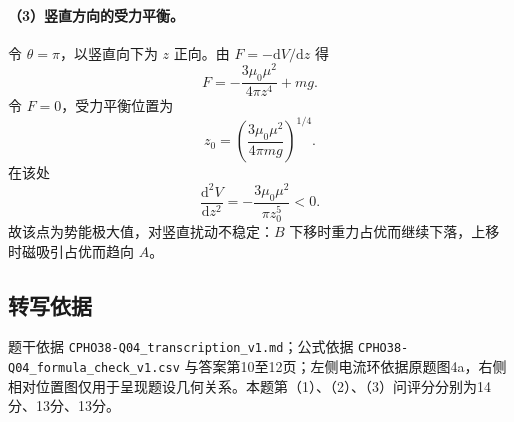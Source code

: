\paragraph{（3）竖直方向的受力平衡。}
令 $\theta=\pi$，以竖直向下为 $z$ 正向。由 $F=-\mathrm dV/\mathrm dz$ 得
\[
F=-\frac{3\mu_0\mu^2}{4\pi z^4}+mg.
\]
令 $F=0$，受力平衡位置为
\[
\boxed{z_0=\left(\frac{3\mu_0\mu^2}{4\pi mg}\right)^{1/4}.}
\]
在该处
\[
\frac{\mathrm d^2V}{\mathrm dz^2}
=-\frac{3\mu_0\mu^2}{\pi z_0^5}<0.
\]
故该点为势能极大值，对竖直扰动不稳定：$B$ 下移时重力占优而继续下落，上移时磁吸引占优而趋向 $A$。

\subsection{转写依据}
题干依据 \texttt{CPHO38-Q04\_transcription\_v1.md}；公式依据 \texttt{CPHO38-Q04\_formula\_check\_v1.csv} 与答案第10至12页；左侧电流环依据原题图4a，右侧相对位置图仅用于呈现题设几何关系。本题第（1）、（2）、（3）问评分分别为14分、13分、13分。
